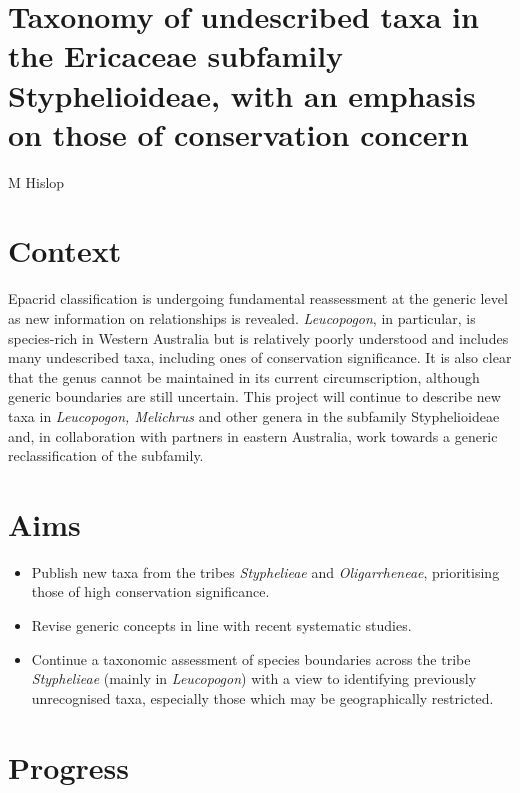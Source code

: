 \documentclass[version=last,
    paper=a4, %
    10pt, %
    usenames,
    dvipsnames,
    oneside, %
    headings=openany, %
    DIV=15 %
]{scrbook}
\begin{document}
\section*{Taxonomy of undescribed taxa in the Ericaceae subfamily Styphelioideae,
with an emphasis on those of conservation concern
}

M Hislop


\section*{Context}
Epacrid classification is undergoing fundamental reassessment at the
generic level as new information on relationships is revealed.
\emph{Leucopogon}, in particular, is species-rich in Western Australia
but is relatively poorly understood and includes many undescribed taxa,
including ones of conservation significance. It is also clear that the
genus cannot be maintained in its current circumscription, although
generic boundaries are still uncertain. This project will continue to
describe new taxa in \emph{Leucopogon, Melichrus} and other genera in
the subfamily Styphelioideae and, in collaboration with partners in
eastern Australia, work towards a generic reclassification of the
subfamily.



\section*{Aims}
\begin{itemize}
\itemsep1pt\parskip0pt
\item
  Publish new taxa from the tribes \emph{Styphelieae} and
  \emph{Oligarrheneae}, prioritising those of high conservation
  significance.
\item
  Revise generic concepts in line with recent systematic studies.
\item
  Continue a taxonomic assessment of species boundaries across the tribe
  \emph{Styphelieae} (mainly in \emph{Leucopogon}) with a view to
  identifying previously unrecognised taxa, especially those which may
  be geographically restricted.
\end{itemize}



\section*{Progress}
~
\end{document}
